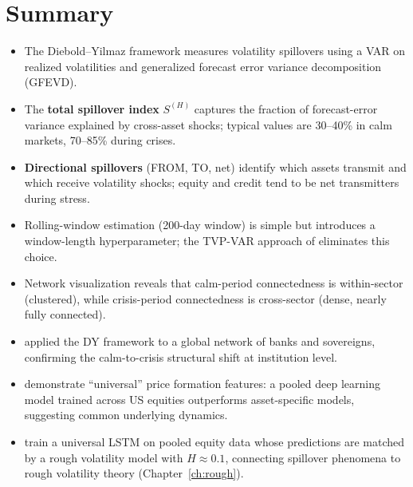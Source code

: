 \section{Summary}\label{sec:spillovers-summary}

\begin{itemize}[nosep]
  \item The Diebold--Yilmaz framework measures volatility spillovers using a VAR
        on realized volatilities and generalized forecast error variance
        decomposition (GFEVD).

  \item The \textbf{total spillover index} $S^{(H)}$ captures the fraction of
        forecast-error variance explained by cross-asset shocks; typical values are
        30--40\% in calm markets, 70--85\% during crises.

  \item \textbf{Directional spillovers} (FROM, TO, net) identify which assets
        transmit and which receive volatility shocks; equity and credit tend to be
        net transmitters during stress.

  \item Rolling-window estimation (200-day window) is simple but introduces a
        window-length hyperparameter; the TVP-VAR approach of
        \citet{AntonakakisChatziantoniouGabauer2020} eliminates this choice.

  \item Network visualization reveals that calm-period connectedness is within-sector
        (clustered), while crisis-period connectedness is cross-sector (dense, nearly
        fully connected).

  \item \citet{DemirerDieboldLiuYilmaz2018} applied the DY framework to a global
        network of banks and sovereigns, confirming the calm-to-crisis structural
        shift at institution level.

  \item \citet{SirignanoCont2019} demonstrate ``universal'' price formation features:
        a pooled deep learning model trained across US equities outperforms
        asset-specific models, suggesting common underlying dynamics.

  \item \citet{RosenbaumZhang2022} train a universal LSTM on pooled equity data
        whose predictions are matched by a rough volatility model with
        $H \approx 0.1$, connecting spillover phenomena to rough volatility
        theory (Chapter~\ref{ch:rough}).


\end{itemize}
